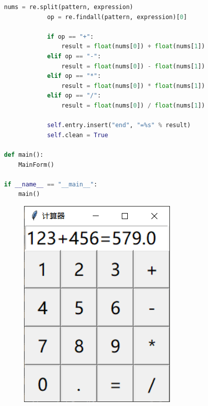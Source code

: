 \begin{lstlisting}[language=Python]
            nums = re.split(pattern, expression)
            op = re.findall(pattern, expression)[0]

            if op == "+":
                result = float(nums[0]) + float(nums[1])
            elif op == "-":
                result = float(nums[0]) - float(nums[1])
            elif op == "*":
                result = float(nums[0]) * float(nums[1])
            elif op == "/":
                result = float(nums[0]) / float(nums[1])
                
            self.entry.insert("end", "=%s" % result)
            self.clean = True

def main():
    MainForm()

if __name__ == "__main__":
    main()
\end{lstlisting}

\begin{tcolorbox}
	\begin{figure}[H]
		\centering
		\includegraphics[]{img/C13/13-3/7.png}
	\end{figure}
\end{tcolorbox}

\newpage